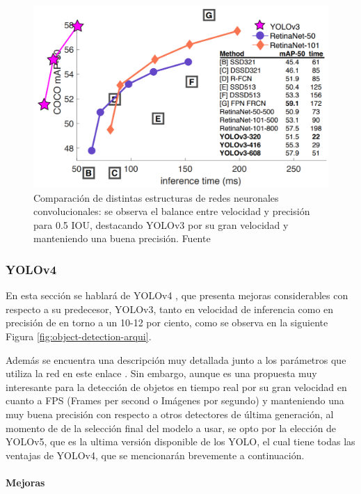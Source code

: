 \begin{figure} [h!]
    \centering
    \includegraphics[width=1\textwidth]{img/ComparacionRN.png}
    \caption{Comparación de distintas estructuras de redes neuronales convolucionales: se observa el balance entre velocidad y precisión para 0.5 IOU, destacando YOLOv3 por su gran velocidad y manteniendo una buena precisión. Fuente\cite{yolov3}}
    \label{fig:comparacion RN}
\end{figure}

\newpage
\subsubsection{YOLOv4}

En esta sección se hablará de YOLOv4 \cite{yolov4}, que presenta mejoras considerables con respecto a su predecesor, YOLOv3, tanto en velocidad de inferencia como en precisión de en torno a un 10-12 por ciento, como se observa en la siguiente Figura \ref{fig:object-detection-arqui}.

Además se encuentra una descripción muy detallada junto a los parámetros que utiliza la red en este enlace \cite{yolov4info}. Sin embargo, aunque es una propuesta muy interesante para la detección de objetos en tiempo real por su gran velocidad en cuanto a FPS (Frames per second o Imágenes por segundo) y manteniendo una muy buena precisión con respecto a otros detectores de última generación, al momento de de la selección final del modelo a usar, se opto por la elección de YOLOv5, que es la ultima versión disponible de los YOLO, el cual tiene todas las ventajas de YOLOv4, que se mencionarán brevemente a continuación. 

\paragraph{Mejoras}

